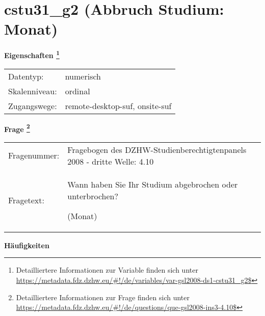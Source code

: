 
    \setcounter{footnote}{0}

    \vspace*{-1.8cm}
	\section{cstu31\_g2 (Abbruch Studium: Monat)}
	\label{section:cstu31_g2}



    \vspace*{0.5cm}
    \noindent\textbf{Eigenschaften
	\footnote{Detailliertere Informationen zur Variable finden sich unter
		\url{https://metadata.fdz.dzhw.eu/\#!/de/variables/var-gsl2008-ds1-cstu31_g2$}}}\\
	\begin{tabularx}{\hsize}{@{}lX}
	Datentyp: & numerisch \\
	Skalenniveau: & ordinal \\
	Zugangswege: &
	  remote-desktop-suf, 
	  onsite-suf
 \\
    \end{tabularx}



				\vspace*{0.5cm}
                \noindent\textbf{Frage
	                \footnote{Detailliertere Informationen zur Frage finden sich unter
		              \url{https://metadata.fdz.dzhw.eu/\#!/de/questions/que-gsl2008-ins3-4.10$}}}\\
				\begin{tabularx}{\hsize}{@{}lX}
					Fragenummer: &
					  Fragebogen des DZHW-Studienberechtigtenpanels 2008 - dritte Welle:
					  4.10
 \\
					Fragetext: & Wann haben Sie Ihr Studium abgebrochen oder unterbrochen?\par  (Monat) \\
				\end{tabularx}





        		\vspace*{0.5cm}
                \noindent\textbf{Häufigkeiten}

